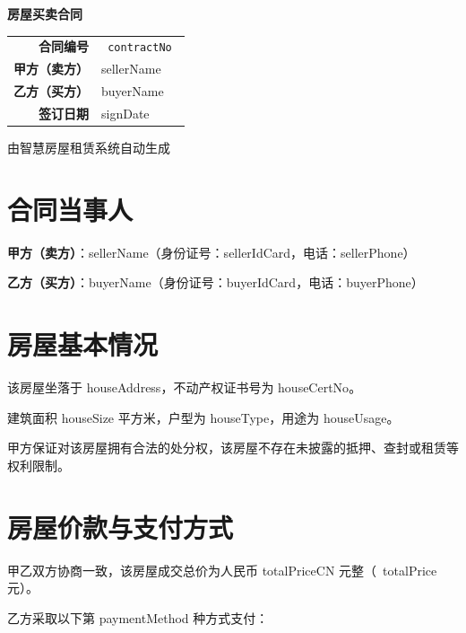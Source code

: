 \documentclass[UTF8,a4paper,12pt]{ctexart}
\begin{document}
\thispagestyle{empty}
\begin{center}
  \vspace*{3cm}
  {\Huge\bfseries\color{primary} 房屋买卖合同}
  \vspace{1.5cm}

  \begin{tabular}{rl}
    \textbf{合同编号} & \texttt{ {{contractNo}} } \\[1em]
    \textbf{甲方（卖方）} & {{sellerName}} \\[1em]
    \textbf{乙方（买方）} & {{buyerName}} \\[1em]
    \textbf{签订日期}   & {{signDate}} \\
  \end{tabular}

  \vspace{2cm}
  {\small\color{gray}由智慧房屋租赁系统自动生成}
\end{center}

\newpage

\section{合同当事人}

\textbf{甲方（卖方）}：{{sellerName}}（身份证号：{{sellerIdCard}}，电话：{{sellerPhone}}）

\textbf{乙方（买方）}：{{buyerName}}（身份证号：{{buyerIdCard}}，电话：{{buyerPhone}}）

\section{房屋基本情况}

该房屋坐落于 {{houseAddress}}，不动产权证书号为 {{houseCertNo}}。

建筑面积 {{houseSize}} 平方米，户型为 {{houseType}}，用途为 {{houseUsage}}。

甲方保证对该房屋拥有合法的处分权，该房屋不存在未披露的抵押、查封或租赁等权利限制。

\section{房屋价款与支付方式}

甲乙双方协商一致，该房屋成交总价为人民币 {{totalPriceCN}} 元整（\textyen\ {{totalPrice}} 元）。

乙方采取以下第 {{paymentMethod}} 种方式支付：
\end{document}

